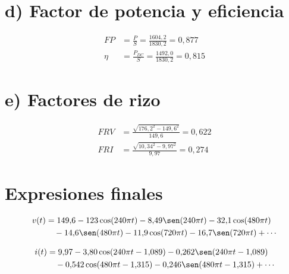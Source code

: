 \documentclass[11pt]{article}
\begin{document}
\section*{d) Factor de potencia y eficiencia}

\begin{align*}
FP &= \frac{P}{S} = \frac{1604{,}2}{1830{,}2} = 0{,}877 \\
\eta &= \frac{P_{DC}}{S} = \frac{1492{,}0}{1830{,}2} = 0{,}815
\end{align*}

\section*{e) Factores de rizo}

\begin{align*}
FRV &= \frac{\sqrt{176{,}2^2 - 149{,}6^2}}{149{,}6} = 0{,}622 \\
FRI &= \frac{\sqrt{10{,}34^2 - 9{,}97^2}}{9{,}97} = 0{,}274
\end{align*}

\section*{Expresiones finales}

\begin{align*}
v(t) &= 149{,}6 - 123\cos(240\pi t) - 8{,}49\sen(240\pi t) - 32{,}1\cos(480\pi t) \\
&\quad - 14{,}6\sen(480\pi t) - 11{,}9\cos(720\pi t) - 16{,}7\sen(720\pi t) + \cdots
\end{align*}

\begin{align*}
i(t) &= 9{,}97 - 3{,}80\cos(240\pi t - 1{,}089) - 0{,}262\sen(240\pi t - 1{,}089) \\
&\quad - 0{,}542\cos(480\pi t - 1{,}315) - 0{,}246\sen(480\pi t - 1{,}315) + \cdots
\end{align*}
\end{document}
